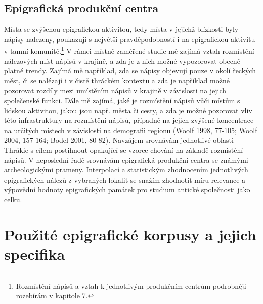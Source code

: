 \subsection[epigrafická-produkční-centra]{Epigrafická produkční centra}

Místa se zvýšenou epigrafickou aktivitou, tedy místa v jejichž blízkosti byly nápisy nalezeny, poukazují s největší pravděpodobností i na epigrafickou aktivitu v tamní komunitě.\footnote{Rozmístění nápisů a vztah k jednotlivým produkčním centrům podrobněji rozebírám v kapitole 7.} V rámci místně zaměřené studie mě zajímá vztah rozmístění nálezových míst nápisů v krajině, a zda je z nich možné vypozorovat obecně platné trendy. Zajímá mě například, zda se nápisy objevují pouze v okolí řeckých měst, či se nalézají i v čistě thráckém kontextu a zda je například možné pozorovat rozdíly mezi umístěním nápisů v krajině v závislosti na jejich společenské funkci. Dále mě zajímá, jaké je rozmístění nápisů vůči místům s lidskou aktivitou, jakou jsou např. města či cesty, a zda je možné pozorovat vliv této infrastruktury na rozmístění nápisů, případně na jejich zvýšené koncentrace na určitých místech v závislosti na demografii regionu (Woolf 1998, 77-105; Woolf 2004, 157-164; Bodel 2001, 80-82). Navzájem srovnávám jednotlivé oblasti Thrákie s cílem postihnout opakující se vzorce chování na základě rozmístění nápisů. V neposlední řadě srovnávám epigrafická produkční centra se známými archeologickými prameny. Interpolací a statistickým zhodnocením jednotlivých epigrafických nálezů z vybraných lokalit se snažím zhodnotit míru relevance a výpovědní hodnoty epigrafických památek pro studium antické společnosti jako celku.

\section[použité-epigrafické-korpusy-a-jejich-specifika]{Použité epigrafické korpusy a jejich specifika}

